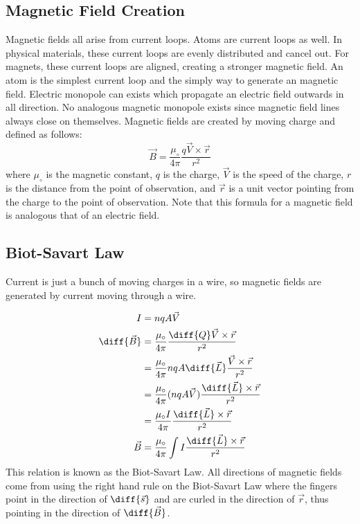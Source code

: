 \documentclass{math}
\begin{document}
\subsection*{Magnetic Field Creation}
Magnetic fields all arise from current loops. Atoms are current loops as well.
In physical materials, these current loops are evenly distributed and cancel
out. For magnets, these current loops are aligned, creating a stronger magnetic
field. An atom is the simplest current loop and the simply way to generate an
magnetic field. Electric monopole can exists which propagate an electric field
outwards in all direction. No analogous magnetic monopole exists since magnetic
field lines always close on themselves. Magnetic fields are created by moving
charge and defined as follows:
\[ \vec{B} = \frac{\mu_{\circ}}{4\pi}\frac{q\vec{V}\times\vec{r}}{r^2} \]
where \( \mu_{\circ} \) is the magnetic constant, \( q \) is the charge,
\( \vec{V} \) is the speed of the charge, \( r \) is the distance from the point
of observation, and \( \vec{r} \) is a unit vector pointing from the charge to
the point of observation. Note that this formula for a magnetic field is
analogous that of an electric field.

\subsection*{Biot-Savart Law}
Current is just a bunch of moving charges in a wire, so magnetic fields are
generated by current moving through a wire.
\begin{center}
\end{center}
\begin{align*}
  I &= nqA\vec{V} \\
  \diff{\vec{B}} &=
    \frac{\mu_{\circ}}{4\pi}\frac{\diff{Q}\vec{V}\times\vec{r}}{r^2} \\
  &= \frac{\mu_{\circ}}{4\pi}nqA\diff{\vec{L}}
    \frac{\vec{V}\times\vec{r}}{r^2} \\
  &= \frac{\mu_{\circ}}{4\pi}(nqA\vec{V})
    \frac{\diff{\vec{L}}\times\vec{r}}{r^2} \\
  &= \frac{\mu_{\circ}I}{4\pi}\frac{\diff{\vec{L}}\times\vec{r}}{r^2} \\
  \vec{B} &= \frac{\mu_{\circ}}{4\pi}
    \int I\frac{\diff{\vec{L}}\times\vec{r}}{r^2}
\end{align*}
This relation is known as the Biot-Savart Law. All directions of magnetic fields
come from using the right hand rule on the Biot-Savart Law where the
fingers point in the direction of \( \diff{\vec{s}} \) and are curled in the
direction of \( \vec{r} \), thus pointing in the direction of
\( \diff{\vec{B}} \).
\end{document}
